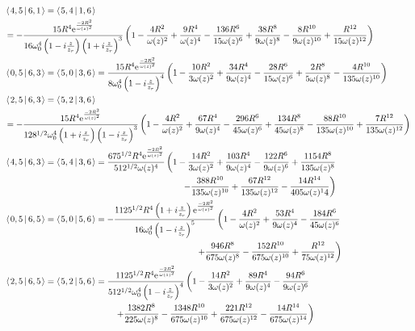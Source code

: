 \documentclass[11pt]{amsart}
\makeatletter
\newcommand{\e}{{\rm e}}				%
\newcommand{\msp}[1]{\mspace{#1mu}}		%
\newcommand{\0}{\varnothing}		%
\newcommand{\brac}[2]{\left\langle\msp{2} #1\left\lvert \msp{3.5} #2 \right.\right\rangle}	%
\newcommand{\1}{!}
\newcommand{\2}{@}
\newcommand{\3}{\#}
\newcommand{\4}{\$}
\newcommand{\5}{\%}
\newcommand{\6}{$^\wedge$}
\newcommand{\7}{\&}
\newcommand{\8}{*}
\newcommand{\9}{(}
\makeatother
\begin{document}
\begin{align*}
&\brac{4,5}{6,1} = \brac{5,4}{1,6} 
\\
&
= -\frac{15R^4\e^{\frac{-2R^2}{\omega(z)^2}}}{16\omega_0^4\left(1-i\frac{z}{z_r}\right)\left(1+i\frac{z}{z_r}\right)^3}\left(1-\frac{4R^2}{\omega(z)^2}+\frac{9R^4}{\omega(z)^4}-\frac{136R^6}{15\omega(z)^6}+\frac{38R^8}{9\omega(z)^8}-\frac{8R^{10}}{9\omega(z)^{10}}+\frac{R^{12}}{15\omega(z)^{12}}\right)
\\
&
\brac{0,5}{6,3} = \brac{5,0}{3,6} = \frac{15R^4\e^{\frac{-2R^2}{\omega(z)^2}}}{8\omega_0^4\left(1-i\frac{z}{z_r}\right)^4}\left(1-\frac{10R^2}{3\omega(z)^2}+\frac{34R^4}{9\omega(z)^4}-\frac{28R^6}{15\omega(z)^6}+\frac{2R^8}{5\omega(z)^8}-\frac{4R^{10}}{135\omega(z)^{10}}\right)
\\
&
\brac{2,5}{6,3} = \brac{5,2}{3,6} 
\\
&
= -\frac{15R^4\e^{\frac{-2R^2}{\omega(z)^2}}}{128^{1/2}\omega_0^4\left(1+i\frac{z}{z_r}\right)\left(1-i\frac{z}{z_r}\right)^3}\left(1-\frac{4R^2}{\omega(z)^2}+\frac{67R^4}{9\omega(z)^4}-\frac{296R^6}{45\omega(z)^6}+\frac{134R^8}{45\omega(z)^8}-\frac{88R^{10}}{135\omega(z)^{10}}+\frac{7R^{12}}{135\omega(z)^{12}}\right)
\\
&
\brac{4,5}{6,3} = \brac{5,4}{3,6} = \frac{675^{1/2}R^4\e^{\frac{-2R^2}{\omega(z)^2}}}{512^{1/2}\omega(z)^4}\left(1-\frac{14R^2}{3\omega(z)^2}+\frac{103R^4}{9\omega(z)^4}-\frac{122R^6}{9\omega(z)^6}+\frac{1154R^8}{135\omega(z)^8}\right.
\\
&
\msp{370}\left.-\frac{388R^{10}}{135\omega(z)^{10}}+\frac{67R^{12}}{135\omega(z)^{12}}-\frac{14R^{14}}{405\omega(z)^14}\right)
\\
&
\brac{0,5}{6,5} = \brac{5,0}{5,6} =-\frac{1125^{1/2}R^4\left(1+i\frac{z}{z_r}\right)\e^{\frac{-2R^2}{\omega(z)^2}}}{16\omega_0^4\left(1-i\frac{z}{z_r}\right)^5}\left(1-\frac{4R^2}{\omega(z)^2}+\frac{53R^4}{9\omega(z)^4}-\frac{184R^6}{45\omega(z)^6}
\right.
\\
&
\msp{400}\left.+\frac{946R^8}{675\omega(z)^8}-\frac{152R^{10}}{675\omega(z)^{10}}+\frac{R^{12}}{75\omega(z)^{12}}\right)
\\
&
\brac{2,5}{6,5} = \brac{5,2}{5,6} = \frac{1125^{1/2}R^4\e^{\frac{-2R^2}{\omega(z)^2}}}{512^{1/2}\omega_0^4\left(1-i\frac{z}{z_r}\right)^4}\left(1-\frac{14R^2}{3\omega(z)^2}+\frac{89R^4}{9\omega(z)^4}-\frac{94R^6}{9\omega(z)^6}\right.
\\
&
\msp{230}\left.+\frac{1382R^8}{225\omega(z)^8}-\frac{1348R^{10}}{675\omega(z)^{10}}+\frac{221R^{12}}{675\omega(z)^{12}}-\frac{14R^{14}}{675\omega(z)^{14}}\right)

\end{align*}
\end{document}
